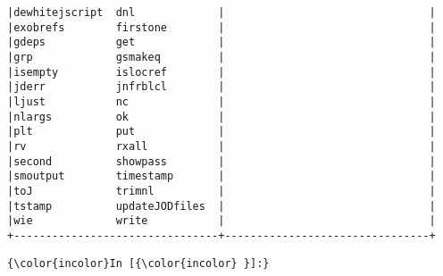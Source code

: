 \documentclass[11pt,letter,landscape]{article}
\begin{document}
\begin{Verbatim}[commandchars=\\\{\}]
|dewhitejscript  dnl             |                                |
|exobrefs        firstone        |                                |
|gdeps           get             |                                |
|grp             gsmakeq         |                                |
|isempty         islocref        |                                |
|jderr           jnfrblcl        |                                |
|ljust           nc              |                                |
|nlargs          ok              |                                |
|plt             put             |                                |
|rv              rxall           |                                |
|second          showpass        |                                |
|smoutput        timestamp       |                                |
|toJ             trimnl          |                                |
|tstamp          updateJODfiles  |                                |
|wie             write           |                                |
+--------------------------------+--------------------------------+

    \end{Verbatim}

    \begin{Verbatim}[commandchars=\\\{\}]
{\color{incolor}In [{\color{incolor} }]:} 
\end{Verbatim}


    
    
    
    
\end{document}
